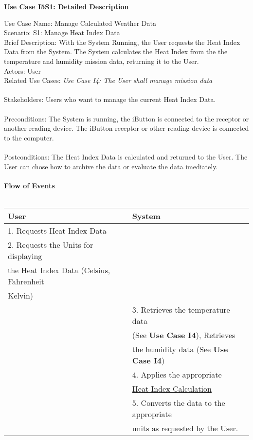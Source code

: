 \documentclass[letterpaper]{article}
\begin{document}
\noindent
\begin{center}
\textbf{Use Case I5S1:  Detailed Description}
\end{center}
Use Case Name:  Manage Calculated Weather Data\\
Scenario:  S1:  Manage Heat Index Data\\
Brief Description:  With the System Running, the User requests the
Heat Index Data from the System.  The System calculates the Heat
Index from the the temperature and humidity mission data, returning
it to the User.\\
Actors:  User\\
Related Use Cases: \textit{Use Case I4:  The User shall manage
mission data}\\\\
Stakeholders:  Users who want to manage the current Heat Index Data.
\\\\
Preconditions:  The System is running, the iButton is connected to
the receptor or another reading device.  The iButton receptor or
other reading device is connected to the computer.\\\\
Postconditions:  The Heat Index Data is calculated and returned to
the User. The User can chose how to archive the data or evaluate the
data imediately.\\\\
\textbf{Flow of Events}\\\\
\begin{tabular}{|l|l|}\hline
\textbf{User} & \textbf{System}\\\hline
1.  Requests Heat Index Data & \\\hline
2.  Requests the Units for displaying &\\
the Heat Index Data (Celsius, Fahrenheit &\\
Kelvin) & \\\hline
 & 3.  Retrieves the temperature data\\
 & (See \textbf{Use Case I4}), Retrieves\\
 & the humidity data (See \textbf{Use Case I4})\\\hline
 & 4.  Applies the appropriate \\
 & \underline{Heat Index Calculation}\\\hline
 & 5.  Converts the data to the appropriate\\
 & units as requested by the User.\\\hline
\end{tabular}\\\\
\end{document}
